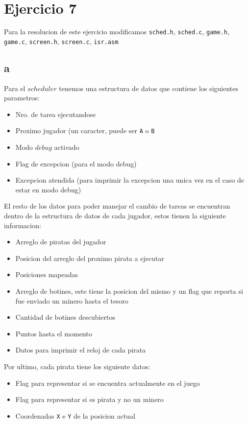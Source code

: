 \section{Ejercicio 7}

Para la resolucion de este ejercicio modificamos \texttt{sched.h}, \texttt{sched.c}, \texttt{game.h}, \texttt{game.c}, \texttt{screen.h}, \texttt{screen.c}, \texttt{isr.asm}

\subsection{a}

Para el $scheduler$ tenemos una estructura de datos que contiene los siguientes parametros:

\begin{itemize}
	\item Nro. de tarea ejecutandose
	\item Proximo jugador (un caracter, puede ser \texttt{A} o \texttt{B}
	\item Modo $debug$ activado
	\item Flag de excepcion (para el modo debug)
	\item Excepcion atendida (para imprimir la excepcion una unica vez en el caso de estar en modo debug)
\end{itemize}

El resto de los datos para poder manejar el cambio de tareas se encuentran dentro de la estructura de datos de cada jugador, estos tienen la siguiente informacion:

\begin{itemize}
	\item Arreglo de piratas del jugador
	\item Posicion del arreglo del proximo pirata a ejecutar
	\item Posiciones mapeadas
	\item Arreglo de botines, este tiene la posicion del mismo y un flag que reporta si fue enviado un minero hasta el tesoro
	\item Cantidad de botines descubiertos
	\item Puntos hasta el momento
	\item Datos para imprimir el reloj de cada pirata
\end{itemize}

Por ultimo, cada pirata tiene los siguiente datos:

\begin{itemize}
	\item Flag para representar si se encuentra actualmente en el juego
	\item Flag para representar si es pirata y no un minero
	\item Coordenadas \texttt{X} e \texttt{Y} de la posicion actual
\end{itemize}

